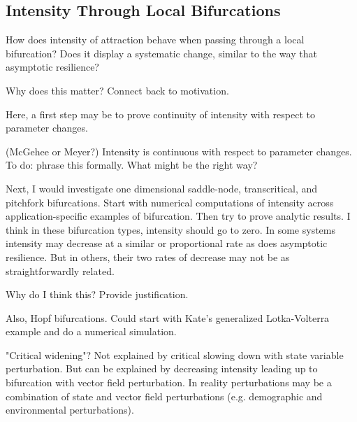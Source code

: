 
\subsection{Intensity Through Local Bifurcations}

How does intensity of attraction behave when passing through a local bifurcation? Does it display a systematic change, similar to the way that asymptotic resilience? 

Why does this matter? Connect back to motivation. 

Here, a first step may be to prove continuity of intensity with respect to parameter changes. 

\begin{conjecture}(McGehee or Meyer?)
	Intensity is continuous with respect to parameter changes. To do: phrase this formally. What might be the right way?
\end{conjecture}

Next, I would investigate one dimensional saddle-node, transcritical, and pitchfork bifurcations. 
%
Start with numerical computations of intensity across application-specific examples of bifurcation. Then try to prove analytic results. 
%
I think in these bifurcation types, intensity should go to zero. In some systems intensity may decrease at a similar or proportional rate as does asymptotic resilience. But in others, their two rates of decrease may not be as straightforwardly related. 

Why do I think this? Provide justification.


Also, Hopf bifurcations. Could start with Kate's generalized Lotka-Volterra example and do a numerical simulation. %


"Critical widening"? Not explained by critical slowing down with state variable perturbation. But can be explained by decreasing intensity leading up to bifurcation with vector field perturbation. In reality perturbations may be a combination of state and vector field perturbations (e.g. demographic and environmental perturbations).

